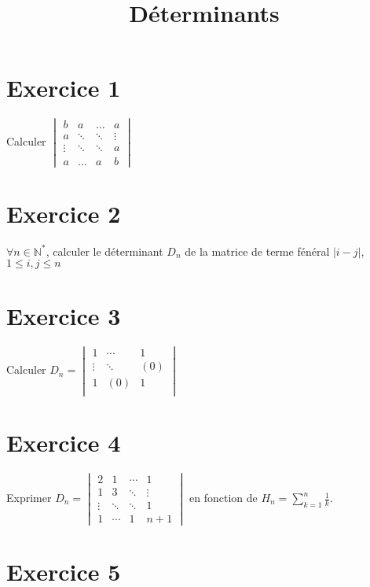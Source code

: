 \documentclass[11pt]{article}
\author{\Name \texttt{\Login}}
\date{}
\title{Déterminants}
\begin{document}
\maketitle

\section*{Exercice 1}
 
Calculer $\begin{vmatrix}
b & a & \dots & a\\
a & \ddots & \ddots & \vdots\\
\vdots & \ddots & \ddots & a\\
a & \dots & a & b
\end{vmatrix}$

\section*{Exercice 2}

$\forall n\in \mathbb{N}^*$, calculer le déterminant $D_n$ de la matrice de terme fénéral $|i-j|$, $1\leq i,j \leq n$ 

\section*{Exercice 3}

Calculer $D_n = \begin{vmatrix}
1 &  \cdots & 1\\
\vdots & \ddots & (0)\\
1 & (0) & 1\\
\end{vmatrix}$

\section*{Exercice 4}

Exprimer $D_n = \begin{vmatrix}
2 & 1 & \cdots & 1\\
1 & 3 & \ddots &  \vdots\\
\vdots & \ddots & \ddots & 1\\
1 & \cdots & 1 & n+1
\end{vmatrix}$ en fonction de $H_n=\sum_{k=1}^n \frac{1}{k}$.

\section*{Exercice 5}
\end{document}
